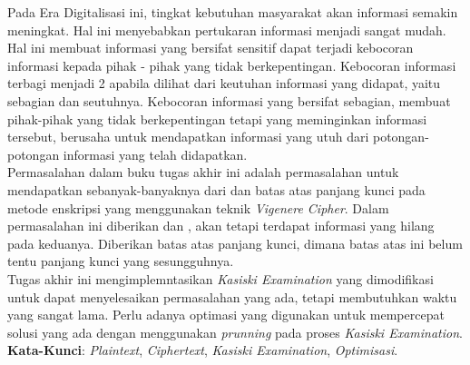 \begin{abstrak}
		\indent Pada Era Digitalisasi ini, tingkat kebutuhan masyarakat akan informasi semakin meningkat. Hal ini menyebabkan pertukaran informasi menjadi sangat mudah. Hal ini membuat informasi yang bersifat sensitif dapat terjadi kebocoran informasi kepada pihak - pihak yang tidak berkepentingan. Kebocoran informasi terbagi menjadi 2 apabila dilihat dari keutuhan informasi yang didapat, yaitu sebagian dan seutuhnya. Kebocoran informasi yang bersifat sebagian, membuat pihak-pihak yang tidak berkepentingan tetapi yang meminginkan informasi tersebut, berusaha untuk mendapatkan informasi yang utuh dari potongan-potongan informasi yang telah didapatkan. 
\\
\indent Permasalahan dalam buku tugas akhir ini adalah permasalahan untuk mendapatkan \plaintext sebanyak-banyaknya dari \ciphertext dan batas atas panjang kunci pada metode enskripsi yang menggunakan teknik \textit{Vigenere Cipher}. Dalam permasalahan ini diberikan \plaintext dan \ciphertext, akan tetapi terdapat informasi yang hilang pada keduanya. Diberikan batas atas panjang kunci, dimana batas atas ini belum tentu panjang kunci yang sesungguhnya.
\\  
\indent Tugas akhir ini mengimplemntasikan \textit{Kasiski Examination} yang dimodifikasi untuk dapat menyelesaikan permasalahan yang ada, tetapi membutuhkan waktu yang sangat lama. Perlu adanya optimasi yang digunakan untuk mempercepat solusi yang ada dengan menggunakan \textit{prunning} pada proses \textit{Kasiski Examination}.
\\
\noindent \textbf{Kata-Kunci}:  \textit{Plaintext}, \textit{Ciphertext}, \textit{Kasiski Examination},  \textit{Optimisasi}.
\end{abstrak}


